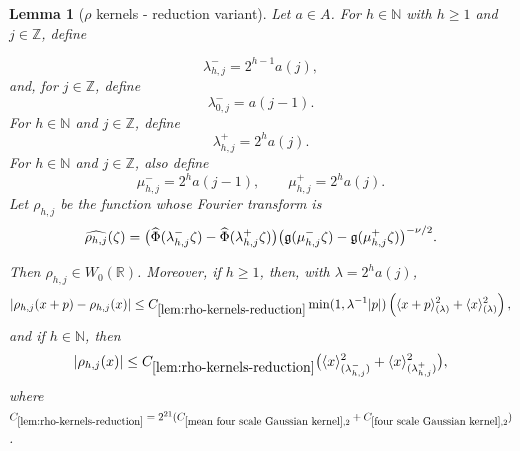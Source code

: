 \documentclass[12pt,reqno]{amsart}
\theoremstyle{plain}
\newtheorem{lemma}[theorem]{Lemma}
\numberwithin{equation}{section}
\theoremstyle{remark}
\newcommand{\uses}[1]{}
\newcommand{\usesdefs}[1]{}
\newcommand{\leanok}{}
\newcommand{\lean}[1]{}
\newcommand{\Z}{{\mathbb Z}}
\newcommand{\N}{{\mathbb N}}
\begin{document}
\begin{lemma}[$\rho$ kernels - reduction variant] \label{lem:rho-kernels-reduction}\uses{mean four scale Gaussian kernel,standard bump properties,four scale Gaussian kernel}\usesdefs{gaussian,bracket bump,auto:Wiener-space-definition,multiplicatively spaced monotone sequences,standard bump}  Let $a\in A$. For $h\in\N$ with $h\ge1$ and $j\in\Z$, define
\lean{Auto.rhoKernelsReduction}
\leanok
\begin{equation}\label{auto:rho-lambda-scales}
\lambda_{h,j}^-=2^{h-1}a(j),
\end{equation}
and, for $j\in\Z$, define
\begin{equation}\label{auto:rho-lambda-zero-scale}
\lambda_{0,j}^-=a(j-1).
\end{equation}
For $h\in\N$ and $j\in\Z$, define
\begin{equation}\label{auto:rho-lambda-upper-scale}
\lambda_{h,j}^+=2^ha(j).
\end{equation}
For $h\in\N$ and $j\in\Z$, also define
\begin{equation}\label{auto:rho-mu-scales}
\mu_{h,j}^-=2^ha(j-1),
\qquad
\mu_{h,j}^+=2^ha(j).
\end{equation}
Let \(\rho_{h,j}\) be the function whose Fourier transform is
\begin{equation}\label{auto:rho-kernel-Fourier-transform}
\widehat{\rho_{h,j}}(\zeta)
=
\bigl(
\widehat\Phi(\lambda_{h,j}^-\zeta)
-
\widehat\Phi(\lambda_{h,j}^+\zeta)
\bigr)
\bigl(
\mathfrak{g}(\mu_{h,j}^-\zeta)
-
\mathfrak{g}(\mu_{h,j}^+\zeta)
\bigr)^{-\nu/2}.
\end{equation}

Then \(\rho_{h,j}\in W_0(\mathbb R)\). Moreover, if \(h\geq1\), then, with $\lambda=2^ha(j)$,
\begin{equation}
    \label{E:increase-data-rho-mean-estimate}
    |\rho_{h,j}(x+p)-\rho_{h,j}(x)|
    \leq
    C_{\ref{lem:rho-kernels-reduction}}
    \min(1,\lambda^{-1}|p|)
    \left(
    \langle x+p\rangle_{(\lambda)}^2
    +
    \langle x\rangle_{(\lambda)}^2
    \right),
\end{equation}
and if $h\in \N$, then
\begin{equation}
    \label{E:increase-data-rho-zero-estimate}
    |\rho_{h,j}(x)|
    \leq
    C_{\ref{lem:rho-kernels-reduction}}
    \big(
    \langle x\rangle_{(\lambda_{h,j}^-)}^2
    +
    \langle x\rangle_{(\lambda_{h,j}^+)}^2
    \big),
\end{equation}
where $C_{\ref{lem:rho-kernels-reduction}} = 2^{21} (C_{\ref{mean four scale Gaussian kernel},2}+C_{\ref{four scale Gaussian kernel},2})$.
\end{lemma}
\end{document}
